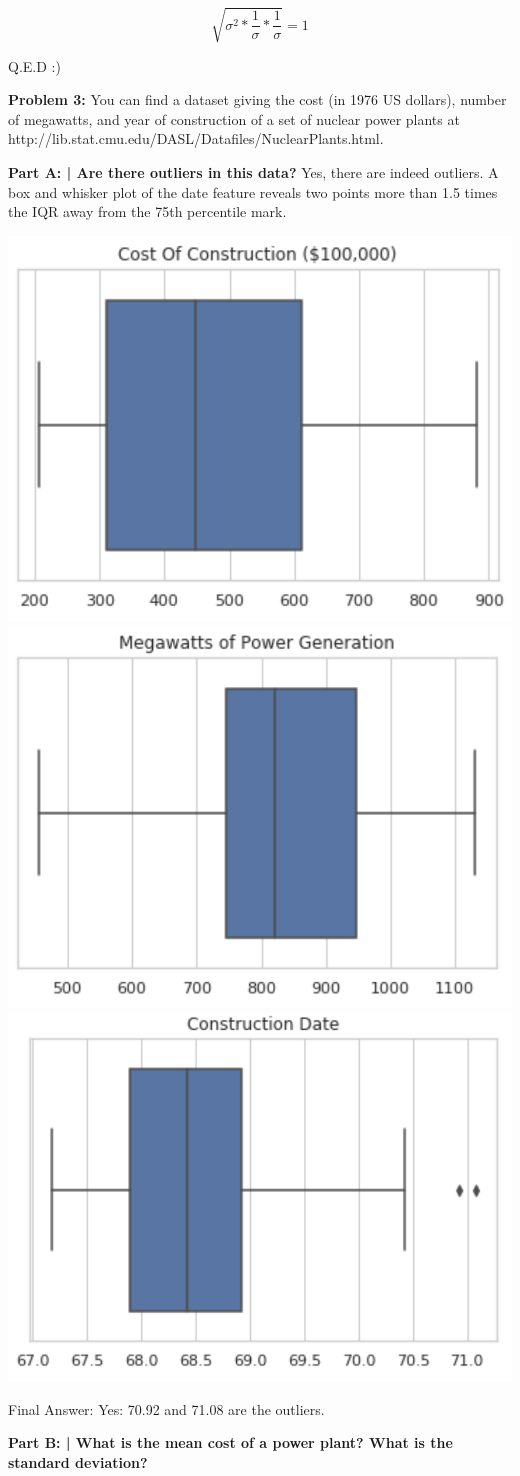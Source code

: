 \documentclass{article}
\begin{document}
\begin{equation}  
\sqrt{\sigma^2*\frac{1}{\sigma}*\frac{1}{\sigma}} = 1
\end{equation}

Q.E.D :)

\newpage
 
\begin{center}
      \Large\textbf{Problem 3:} You can find a dataset giving the cost (in 1976 US dollars), number of megawatts, and year of construction of a set of nuclear power plants at http://lib.stat.cmu.edu/DASL/Datafiles/NuclearPlants.html.\par
\end{center}

\textbf{Part A: | Are there outliers in this data?}\newline\newline
 Yes, there are indeed outliers. A box and whisker plot of the date feature reveals two points more than 1.5 times the IQR away from the 75th percentile mark.\newline
 
 \includegraphics[width=.3\textwidth]{HW1_11.PNG}\includegraphics[width=.3\textwidth]{HW1_12.PNG}\includegraphics[width=.3\textwidth]{HW1_13.PNG}
 
 Final Answer: Yes: 70.92 and 71.08 are the outliers.\newline
 
 \textbf{Part B: | What is the mean cost of a power plant? What is the standard deviation?}\newline
 
\end{document}
